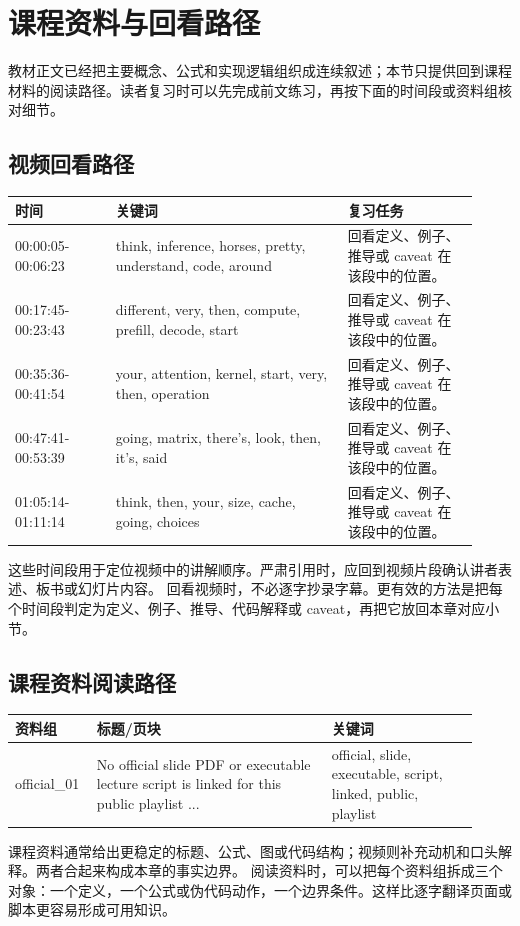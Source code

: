 \documentclass[a4paper]{article}
\begin{document}
\section{课程资料与回看路径}
教材正文已经把主要概念、公式和实现逻辑组织成连续叙述；本节只提供回到课程材料的阅读路径。读者复习时可以先完成前文练习，再按下面的时间段或资料组核对细节。
\subsection{视频回看路径}
\begin{longtable}{p{0.20\linewidth}p{0.46\linewidth}p{0.26\linewidth}}
\toprule
\textbf{时间} & \textbf{关键词} & \textbf{复习任务}\\
\midrule
00:00:05-00:06:23 & think, inference, horses, pretty, understand, code, around & 回看定义、例子、推导或 caveat 在该段中的位置。\\
00:17:45-00:23:43 & different, very, then, compute, prefill, decode, start & 回看定义、例子、推导或 caveat 在该段中的位置。\\
00:35:36-00:41:54 & your, attention, kernel, start, very, then, operation & 回看定义、例子、推导或 caveat 在该段中的位置。\\
00:47:41-00:53:39 & going, matrix, there's, look, then, it's, said & 回看定义、例子、推导或 caveat 在该段中的位置。\\
01:05:14-01:11:14 & think, then, your, size, cache, going, choices & 回看定义、例子、推导或 caveat 在该段中的位置。\\
\bottomrule
\end{longtable}
这些时间段用于定位视频中的讲解顺序。严肃引用时，应回到视频片段确认讲者表述、板书或幻灯片内容。
回看视频时，不必逐字抄录字幕。更有效的方法是把每个时间段判定为定义、例子、推导、代码解释或 caveat，再把它放回本章对应小节。
\subsection{课程资料阅读路径}
\begin{longtable}{p{0.14\linewidth}p{0.48\linewidth}p{0.30\linewidth}}
\toprule
\textbf{资料组} & \textbf{标题/页块} & \textbf{关键词}\\
\midrule
official\_01 & No official slide PDF or executable lecture script is linked for this public playlist ... & official, slide, executable, script, linked, public, playlist\\
\bottomrule
\end{longtable}
课程资料通常给出更稳定的标题、公式、图或代码结构；视频则补充动机和口头解释。两者合起来构成本章的事实边界。
阅读资料时，可以把每个资料组拆成三个对象：一个定义，一个公式或伪代码动作，一个边界条件。这样比逐字翻译页面或脚本更容易形成可用知识。
\end{document}
